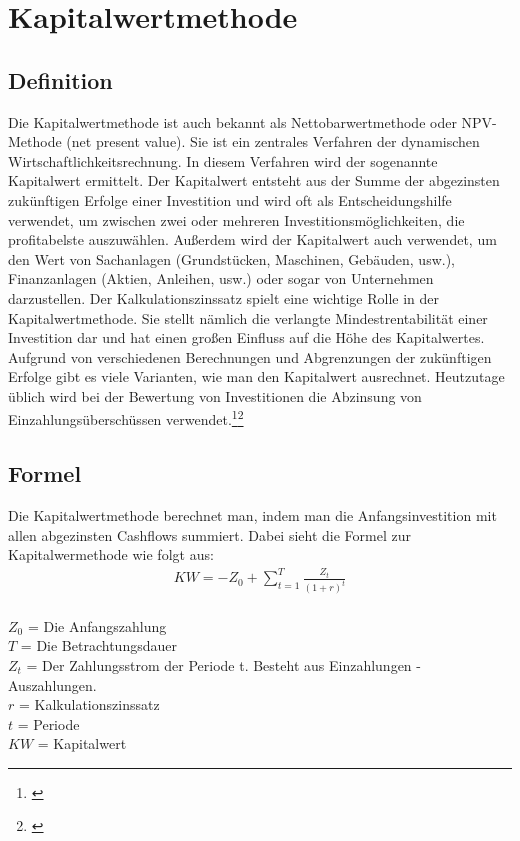 \chapter{Kapitalwertmethode}
\label{Kapitalwertmethode}

\section{Definition}
Die Kapitalwertmethode ist auch bekannt als Nettobarwertmethode oder NPV-Methode (net present value).
Sie ist ein zentrales Verfahren der dynamischen Wirtschaftlichkeitsrechnung. In diesem Verfahren wird der sogenannte Kapitalwert ermittelt. Der Kapitalwert entsteht aus der Summe der abgezinsten zukünftigen Erfolge einer Investition und wird oft als Entscheidungshilfe verwendet, um zwischen zwei oder mehreren Investitionsmöglichkeiten, die profitabelste auszuwählen. Außerdem wird der Kapitalwert auch verwendet, um den Wert von Sachanlagen (Grundstücken, Maschinen, Gebäuden, usw.), Finanzanlagen (Aktien, Anleihen, usw.) oder sogar von Unternehmen darzustellen.
Der Kalkulationszinssatz spielt eine wichtige Rolle in der Kapitalwertmethode. Sie stellt nämlich die verlangte Mindestrentabilität einer Investition dar und hat einen großen Einfluss auf die Höhe des Kapitalwertes.
Aufgrund von verschiedenen Berechnungen und Abgrenzungen der zukünftigen Erfolge gibt es viele Varianten, wie man den Kapitalwert ausrechnet. Heutzutage üblich wird bei der Bewertung von Investitionen die Abzinsung von Einzahlungsüberschüssen verwendet.\footnote{\cite{wikipedia-kapitalwertmethode}}\footnote{\cite{weltsparen-kapitalwertmethode}}
\newpage
\section{Formel}
Die Kapitalwertmethode berechnet man, indem man die Anfangsinvestition mit allen abgezinsten Cashflows summiert. Dabei sieht die Formel zur Kapitalwermethode wie folgt aus:
\begin{align*}
    KW = -Z_{0} + \sum \limits_{t=1}^{T}{\frac{Z_{t}}{(1+r)^{t}}}
\end{align*}
\\
$Z_0$ = Die Anfangszahlung \\
$T$  = Die Betrachtungsdauer\\
$Z_t$ = Der Zahlungsstrom der Periode t. Besteht aus Einzahlungen - Auszahlungen.\\
$r$ = Kalkulationszinssatz\\
$t$ = Periode\\
$KW$ = Kapitalwert
